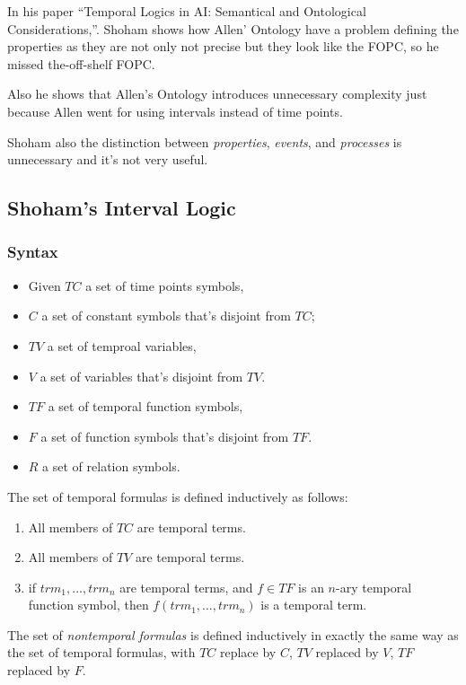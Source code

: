 In his paper ``Temporal Logics in AI: Semantical and Ontological Considerations,''\cite{shoham1988temporal}. 
Shoham shows how Allen' Ontology have a problem defining the properties as they are not only not precise but they look like the FOPC, so he missed the-off-shelf FOPC.

Also he shows that Allen's Ontology introduces unnecessary complexity just because Allen went for using intervals instead of time points.

Shoham also the distinction between \textit{properties}, \textit{events}, and \textit{processes} is unnecessary and it's not very useful.


\subsection{Shoham's Interval Logic}
\subsubsection{Syntax}
\begin{itemize}
  \item Given $TC$ a set of time points symbols,
  \item $C$ a set of constant symbols that's disjoint from $TC$;
  \item $TV$ a set of temproal variables,
  \item $V$ a set of variables that's disjoint from $TV$. 
  \item $TF$ a set of temporal function symbols,
  \item $F$ a set of function symbols that's disjoint from $TF$.
  \item $R$ a set of relation symbols.
\end{itemize}

The set of temporal formulas is defined inductively as follows:
\begin{enumerate}
  \item All members of $TC$ are temporal terms.
  \item All members of $TV$ are temporal terms.
  \item if $trm_1, \dots, trm_n$ are temporal terms, and $f \in TF$ is an $n$-ary temporal function symbol, then $f(trm_1, \dots, trm_n)$ is a temporal term.
\end{enumerate}

The set of \textit{nontemporal formulas} is defined inductively in exactly the same way as the set of temporal formulas, with 
$TC$ replace by $C$, $TV$ replaced by $V$, $TF$ replaced by $F$.

